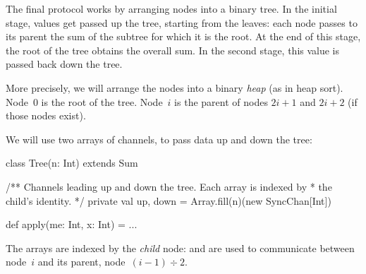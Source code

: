 \documentclass[notes,color]{sepslide0}
\begin{document}

\begin{slide}

The final protocol works by arranging nodes into a binary tree.  In the
initial stage, values get passed up the tree, starting from the leaves: each
node passes to its parent the sum of the subtree for which it is the root.  At
the end of this stage, the root of the tree obtains the overall sum.  In the
second stage, this value is passed back down the tree.
\end{slide}


\begin{slide}

More precisely, we will arrange the nodes into a binary \emph{heap} (as in
heap sort).  Node~$0$ is the root of the tree.  Node~$i$ is the parent of nodes
$2i+1$ and $2i+2$ (if those nodes exist).
\begin{center}
\end{center}
\end{slide}


\begin{slide}

We will use two arrays of channels, to pass data up and down the tree:
%
\begin{scala}
class Tree(n: Int) extends Sum{
  /** Channels leading up and down the tree.  Each array is indexed by
    * the child's identity. */
  private val up, down = Array.fill(n)(new SyncChan[Int])
  
  def apply(me: Int, x: Int) = ...
}
\end{scala}
%
The arrays are indexed by the \emph{child} node:  and
 are used to communicate between node~$i$ and its
parent, node~$(i-1) \div 2$.
\end{slide}
\end{document}
